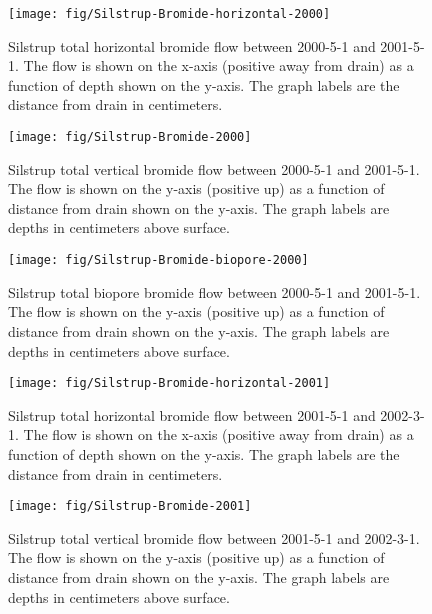 \begin{figure}[htbp]
  \centering
  \texttt{[image: fig/Silstrup-Bromide-horizontal-2000]}
  
  \caption{Silstrup total horizontal bromide flow between 2000-5-1 and
    2001-5-1.  The flow is shown on the x-axis (positive away from
    drain) as a function of depth shown on the y-axis.  The graph
    labels are the distance from drain in centimeters.}
  \label{fig:Silstrup-Bromide-2000-horizontal}
\end{figure}\FloatBarrier

\begin{figure}[htbp]
  \centering
  \texttt{[image: fig/Silstrup-Bromide-2000]}
  
  \caption{Silstrup total vertical bromide flow between 2000-5-1 and
    2001-5-1.  The flow is shown on the y-axis (positive up) as a
    function of distance from drain shown on the y-axis.  The graph
    labels are depths in centimeters above surface.}
  \label{fig:Silstrup-Bromide-2000-vertical}
\end{figure}\FloatBarrier

\begin{figure}[htbp]
  \centering
  \texttt{[image: fig/Silstrup-Bromide-biopore-2000]}
  
  \caption{Silstrup total biopore bromide flow between 2000-5-1 and
    2001-5-1.  The flow is shown on the y-axis (positive up) as a
    function of distance from drain shown on the y-axis.  The graph
    labels are depths in centimeters above surface.}
  \label{fig:Silstrup-Bromide-biopore-2000}
\end{figure}\FloatBarrier

\begin{figure}[htbp]
  \centering
  \texttt{[image: fig/Silstrup-Bromide-horizontal-2001]}
  
  \caption{Silstrup total horizontal bromide flow between 2001-5-1 and
    2002-3-1.  The flow is shown on the x-axis (positive away from
    drain) as a function of depth shown on the y-axis.  The graph
    labels are the distance from drain in centimeters.}
  \label{fig:Silstrup-Bromide-2001-horizontal}
\end{figure}\FloatBarrier

\begin{figure}[htbp]
  \centering
  \texttt{[image: fig/Silstrup-Bromide-2001]}
  
  \caption{Silstrup total vertical bromide flow between 2001-5-1 and
    2002-3-1.  The flow is shown on the y-axis (positive up) as a
    function of distance from drain shown on the y-axis.  The graph
    labels are depths in centimeters above surface.}
  \label{fig:Silstrup-Bromide-2001-vertical}
\end{figure}\FloatBarrier

